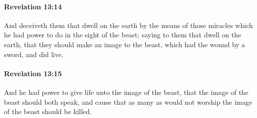 		\paragraph{Revelation 13:14} %
			\label{REVELATIONNT-13-14}

			And deceiveth them that dwell on the earth by the means of those miracles which he had power to do in the sight of the beast; saying to them that dwell on the earth, that they should make an image to the beast, which had the wound by a sword, and did live.

			\begin{framed}
			\scriptsize
				\begin{compactdesc}
					\item[SBLG] 
				\end{compactdesc}
			\end{framed}

		\paragraph{Revelation 13:15} %
			\label{REVELATIONNT-13-15}

			And he had power to give life unto the image of the beast, that the image of the beast should both speak, and cause that as many as would not worship the image of the beast should be killed.

